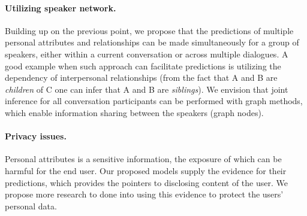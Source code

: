 \paragraph{Utilizing speaker network.} Building up on the previous point, we propose that the predictions of multiple personal attributes and relationships can be made simultaneously for a group of speakers, either within a current conversation or across multiple dialogues. A good example when such approach can facilitate predictions is utilizing the dependency of interpersonal relationships (from the fact that A and B are \textit{children} of C one can infer that A and B are \textit{siblings}). We envision that joint inference for all conversation participants can be performed with graph methods, which enable information sharing between the speakers (graph nodes).

\paragraph{Privacy issues.} Personal attributes is a sensitive information, the exposure of which can be harmful for the end user. Our proposed models supply the evidence for their predictions, which provides the pointers to disclosing content of the user. We propose more research to done into using this evidence to protect the users' personal data. 

